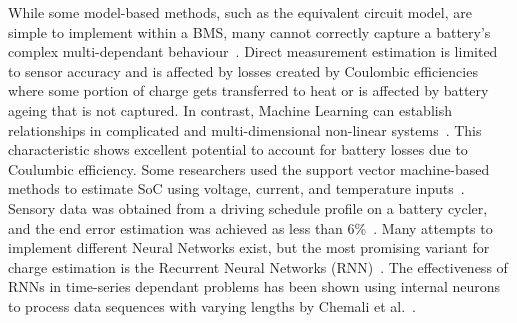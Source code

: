 %
While some model-based methods, such as the equivalent circuit model, are simple to implement within a BMS, many cannot correctly capture a battery's complex multi-dependant behaviour~\cite{6953745}.
Direct measurement estimation is limited to sensor accuracy and is affected by losses created by Coulombic efficiencies~\cite{Smith_2010} where some portion of charge gets transferred to heat or is affected by battery ageing that is not captured.
%
In contrast, Machine Learning can establish relationships in complicated and multi-dimensional non-linear systems~\cite{hansen_support_2005,anton_battery_2013,he_state_2014}.
This characteristic shows excellent potential to account for battery losses due to Coulumbic efficiency.
Some researchers used the support vector machine-based methods to estimate SoC using voltage, current, and temperature inputs~\cite{hansen_support_2005,anton_battery_2013}.
Sensory data was obtained from a driving schedule profile on a battery cycler, and the end error estimation was achieved as less than 6\%~\cite{he_state_2014}.
Many attempts to implement different Neural Networks exist, but the most promising variant for charge estimation is the Recurrent Neural Networks (RNN)~\cite{song_lithium-ion_2018, Chemali2017, mamo_long_2020, jiao_gru-rnn_2020, xiao_accurate_2019, javid_adaptive_2020, zhang_deep_2020}.
The effectiveness of RNNs in time-series dependant problems has been shown using internal neurons to process data sequences with varying lengths by Chemali et al.~\cite{Chemali2017}.

